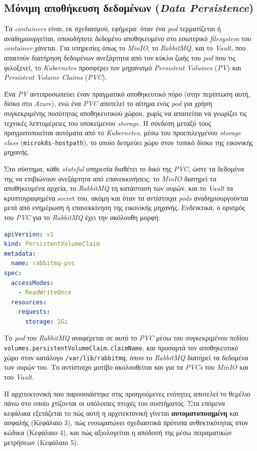 \newpage
\subsection{Μόνιμη αποθήκευση δεδομένων (\textit{Data Persistence})}

Τα \textit{containers} είναι, εκ σχεδιασμού, εφήμερα: όταν ένα \textit{pod} τερματίζεται ή αναδημιουργείται, οποιοδήποτε δεδομένο αποθηκευμένο στο εσωτερικό \textit{filesystem} του \textit{container} χάνεται. Για υπηρεσίες όπως το \textit{MinIO}, το \textit{RabbitMQ}, και το \textit{Vault}, που απαιτούν διατήρηση δεδομένων ανεξάρτητα από τον κύκλο ζωής του \textit{pod} που τις φιλοξενεί, το \textit{Kubernetes} προσφέρει τον μηχανισμό \textit{Persistent Volumes} (\textit{PV}) και \textit{Persistent Volume Claims} (\textit{PVC}).

Ένα \textit{PV} αντιπροσωπεύει έναν πραγματικό αποθηκευτικό πόρο (στην περίπτωση αυτή, δίσκο στο \textit{Azure}), ενώ ένα \textit{PVC} αποτελεί το αίτημα ενός \textit{pod} για χρήση συγκεκριμένης ποσότητας αποθηκευτικού χώρου, χωρίς να απαιτείται να γνωρίζει τις τεχνικές λεπτομέρειες του υποκείμενου \textit{storage}. Η σύνδεση μεταξύ τους πραγματοποιείται αυτόματα από το \textit{Kubernetes}, μέσω του προεπιλεγμένου \textit{storage class} (\texttt{microk8s-hostpath}), το οποίο δεσμεύει χώρο στον τοπικό δίσκο της εικονικής μηχανής.

Στο σύστημα, κάθε \textit{stateful} υπηρεσία διαθέτει το δικό της \textit{PVC}, ώστε τα δεδομένα της να επιβιώνουν ανεξάρτητα από επανεκκινήσεις: το \textit{MinIO} διατηρεί τα αποθηκευμένα αρχεία, το \textit{RabbitMQ} τη κατάσταση των ουρών, και το \textit{Vault} τα κρυπτογραφημένα secret του, ακόμη και όταν τα αντίστοιχα \textit{pods} αναδημιουργούνται μετά από ενημέρωση ή επανεκκίνηση της εικονικής μηχανής.\newline\newline
Ενδεικτικά, ο ορισμός του \textit{PVC} για το \textit{RabbitMQ} έχει την ακόλουθη μορφή: \newline

\begin{lstlisting}[language=yaml, caption={PersistentVolumeClaim για το RabbitMQ}]
apiVersion: v1
kind: PersistentVolumeClaim
metadata:
  name: rabbitmq-pvc
spec:
  accessModes:
    - ReadWriteOnce
  resources:
    requests:
      storage: 1Gi
\end{lstlisting}

Το \textit{pod} του \textit{RabbitMQ} αναφέρεται σε αυτό το \textit{PVC} μέσω του συγκεκριμένου πεδίου \texttt{volumes.persistentVolumeClaim.claimName}, και προσαρτά τον αποθηκευτικό χώρο στον κατάλογο \texttt{/var/lib/rabbitmq}, όπου το \textit{RabbitMQ} διατηρεί τα δεδομένα των ουρών του. Το αντίστοιχο μοτίβο ακολουθείται και για τα \textit{PVCs} του \textit{MinIO} και του \textit{Vault}.

Η αρχιτεκτονική που παρουσιάστηκε στις προηγούμενες ενότητες αποτελεί το θεμέλιο πάνω στο οποίο χτίζονται οι υπόλοιπες πτυχές του συστήματος. Στα επόμενα κεφάλαια εξετάζεται το πώς αυτή η αρχιτεκτονική γίνεται \textbf{αυτοματοποιημένη} και ασφαλής (Κεφάλαιο 3), πώς ενσωματώνει σχεδιαστικά πρότυπα ανθεκτικότητας στον κώδικα (Κεφάλαιο 4), και πώς αξιολογείται η απόδοσή της μέσω πειραματικών μετρήσεων (Κεφάλαιο 5).
